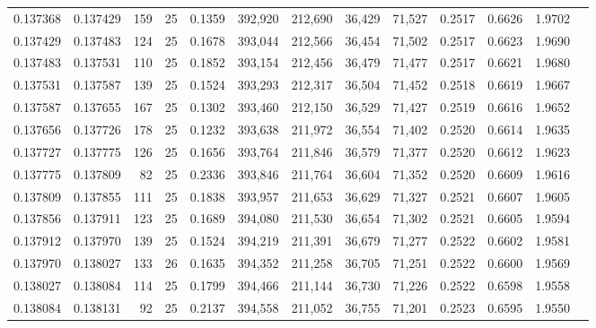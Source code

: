 \begin{tabular}{rrrrrrrrrrrrr}
0.137368 & 0.137429 &   159 &  25 &                                     0.1359 & 392,920 & 212,690 &  36,429 &  71,527 & 0.2517 & 0.6626 & 1.9702 \\
0.137429 & 0.137483 &   124 &  25 &                                     0.1678 & 393,044 & 212,566 &  36,454 &  71,502 & 0.2517 & 0.6623 & 1.9690 \\
0.137483 & 0.137531 &   110 &  25 &                                     0.1852 & 393,154 & 212,456 &  36,479 &  71,477 & 0.2517 & 0.6621 & 1.9680 \\
0.137531 & 0.137587 &   139 &  25 &                                     0.1524 & 393,293 & 212,317 &  36,504 &  71,452 & 0.2518 & 0.6619 & 1.9667 \\
0.137587 & 0.137655 &   167 &  25 &                                     0.1302 & 393,460 & 212,150 &  36,529 &  71,427 & 0.2519 & 0.6616 & 1.9652 \\
0.137656 & 0.137726 &   178 &  25 &                                     0.1232 & 393,638 & 211,972 &  36,554 &  71,402 & 0.2520 & 0.6614 & 1.9635 \\
0.137727 & 0.137775 &   126 &  25 &                                     0.1656 & 393,764 & 211,846 &  36,579 &  71,377 & 0.2520 & 0.6612 & 1.9623 \\
0.137775 & 0.137809 &    82 &  25 &                                     0.2336 & 393,846 & 211,764 &  36,604 &  71,352 & 0.2520 & 0.6609 & 1.9616 \\
0.137809 & 0.137855 &   111 &  25 &                                     0.1838 & 393,957 & 211,653 &  36,629 &  71,327 & 0.2521 & 0.6607 & 1.9605 \\
0.137856 & 0.137911 &   123 &  25 &                                     0.1689 & 394,080 & 211,530 &  36,654 &  71,302 & 0.2521 & 0.6605 & 1.9594 \\
0.137912 & 0.137970 &   139 &  25 &                                     0.1524 & 394,219 & 211,391 &  36,679 &  71,277 & 0.2522 & 0.6602 & 1.9581 \\
0.137970 & 0.138027 &   133 &  26 &                                     0.1635 & 394,352 & 211,258 &  36,705 &  71,251 & 0.2522 & 0.6600 & 1.9569 \\
0.138027 & 0.138084 &   114 &  25 &                                     0.1799 & 394,466 & 211,144 &  36,730 &  71,226 & 0.2522 & 0.6598 & 1.9558 \\
0.138084 & 0.138131 &    92 &  25 &                                     0.2137 & 394,558 & 211,052 &  36,755 &  71,201 & 0.2523 & 0.6595 & 1.9550 \\

\end{tabular}
